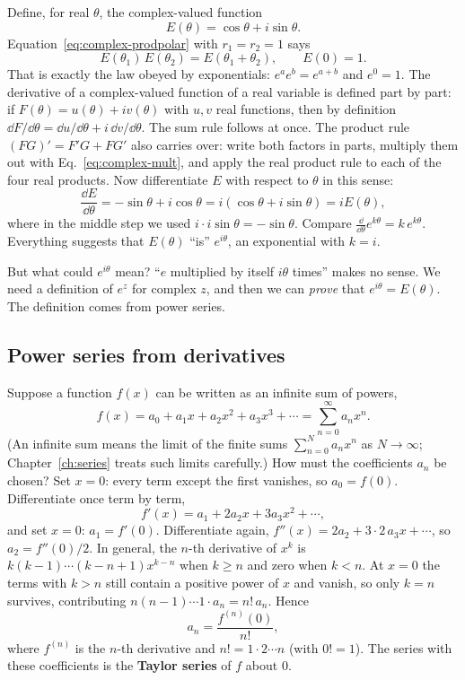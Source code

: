 Define, for real $\theta$, the complex-valued function
\[
E(\theta)=\cos\theta+i\sin\theta .
\]
Equation~\eqref{eq:complex-prodpolar} with $r_1=r_2=1$ says
\begin{equation}
E(\theta_1)\,E(\theta_2)=E(\theta_1+\theta_2),\qquad E(0)=1.\label{eq:complex-Elaw}
\end{equation}
That is exactly the law obeyed by exponentials: $e^{a}e^{b}=e^{a+b}$ and $e^0=1$. The derivative of a complex-valued function of a real variable is defined part by part: if $F(\theta)=u(\theta)+iv(\theta)$ with $u,v$ real functions, then by definition $\dd F/\dd\theta=\dd u/\dd\theta+i\,\dd v/\dd\theta$. The sum rule follows at once. The product rule $(FG)'=F'G+FG'$ also carries over: write both factors in parts, multiply them out with Eq.~\eqref{eq:complex-mult}, and apply the real product rule to each of the four real products. Now differentiate $E$ with respect to $\theta$ in this sense:
\[
\frac{\dd E}{\dd\theta}=-\sin\theta+i\cos\theta=i(\cos\theta+i\sin\theta)=iE(\theta),
\]
where in the middle step we used $i\cdot i\sin\theta=-\sin\theta$. Compare $\frac{\dd}{\dd\theta}e^{k\theta}=k\,e^{k\theta}$. Everything suggests that $E(\theta)$ ``is'' $e^{i\theta}$, an exponential with $k=i$.

But what could $e^{i\theta}$ mean? ``$e$ multiplied by itself $i\theta$ times'' makes no sense. We need a definition of $e^{z}$ for complex $z$, and then we can \emph{prove} that $e^{i\theta}=E(\theta)$. The definition comes from power series.

\subsection{Power series from derivatives}

Suppose a function $f(x)$ can be written as an infinite sum of powers,
\begin{equation}
f(x)=a_0+a_1x+a_2x^2+a_3x^3+\cdots=\sum_{n=0}^{\infty}a_nx^n .\label{eq:complex-powerseries}
\end{equation}
(An infinite sum means the limit of the finite sums $\sum_{n=0}^{N}a_nx^n$ as $N\to\infty$; Chapter~\ref{ch:series} treats such limits carefully.) How must the coefficients $a_n$ be chosen? Set $x=0$: every term except the first vanishes, so $a_0=f(0)$. Differentiate once term by term,
\[
f'(x)=a_1+2a_2x+3a_3x^2+\cdots,
\]
and set $x=0$: $a_1=f'(0)$. Differentiate again, $f''(x)=2a_2+3\cdot2\,a_3x+\cdots$, so $a_2=f''(0)/2$. In general, the $n$-th derivative of $x^k$ is $k(k-1)\cdots(k-n+1)x^{k-n}$ when $k\ge n$ and zero when $k<n$. At $x=0$ the terms with $k>n$ still contain a positive power of $x$ and vanish, so only $k=n$ survives, contributing $n(n-1)\cdots1\cdot a_n=n!\,a_n$. Hence
\begin{equation}
a_n=\frac{f^{(n)}(0)}{n!},\label{eq:complex-taylorcoef}
\end{equation}
where $f^{(n)}$ is the $n$-th derivative and $n!=1\cdot2\cdots n$ (with $0!=1$). The series with these coefficients is the \textbf{Taylor series} of $f$ about $0$.

